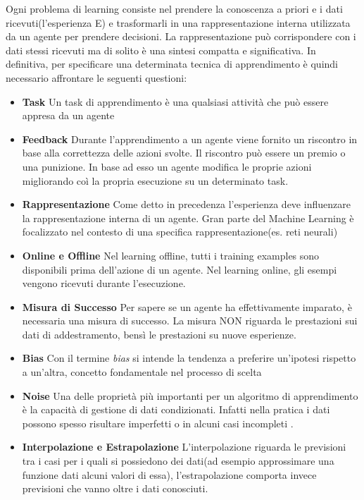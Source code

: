 Ogni problema di learning consiste nel prendere la conoscenza a priori e i dati ricevuti(l'esperienza E) e 
trasformarli in una rappresentazione  interna utilizzata da un agente per prendere decisioni. La rappresentazione
può corrispondere con i dati stessi ricevuti ma di solito è una sintesi compatta e significativa. 
In definitiva, per specificare una determinata tecnica di apprendimento è quindi necessario affrontare le seguenti\cite{PooleMackworth17} questioni:
\begin{itemize}
  \item \textbf{Task} Un task di apprendimento è una qualsiasi attività che può essere appresa da un agente
  \item \textbf{Feedback} Durante l'apprendimento a un agente viene fornito un riscontro in base alla correttezza delle azioni svolte. Il riscontro può essere un premio o una punizione.  In base ad esso un agente modifica le proprie azioni
  migliorando coì la propria esecuzione su un determinato task.
  \item \textbf{Rappresentazione} Come detto in precedenza l'esperienza deve influenzare la rappresentazione interna di un agente.
  Gran parte del Machine Learning è focalizzato nel contesto di una specifica rappresentazione(es. reti neurali)
  \item \textbf{Online e Offline} Nel learning offline, tutti i training examples sono disponibili prima dell'azione di un agente. Nel learning online,
  gli esempi vengono ricevuti durante l'esecuzione.
  \item \textbf{Misura di Successo} Per sapere se un agente ha effettivamente imparato, è necessaria una misura di successo. La misura NON riguarda le prestazioni sui dati di addestramento, bensì le prestazioni su nuove esperienze.
  \item \textbf{Bias} Con il termine \emph{bias} si intende la tendenza a preferire un'ipotesi rispetto a un'altra, concetto fondamentale nel processo di scelta
  \item \textbf{Noise} Una delle proprietà più importanti per un algoritmo di apprendimento è la capacità di gestione di dati condizionati.
  Infatti nella pratica i dati possono spesso risultare imperfetti o in alcuni casi incompleti .
  \item \textbf{Interpolazione e Estrapolazione} L'interpolazione riguarda le previsioni tra i  casi per i quali si possiedono dei dati(ad esempio approssimare una funzione dati alcuni valori di essa), l'estrapolazione comporta invece 
  previsioni che vanno oltre i dati conosciuti.
\end{itemize}
